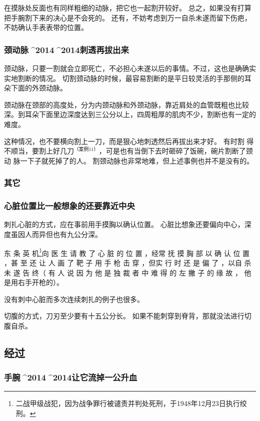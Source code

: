 \documentclass[UTF8]{ctexart}
\begin{document}
在摸脉处反面也有同样粗细的动脉，把它也一起割开较好。
总之，如果没有打算把手腕割下来的决心是不会死的。 
还有，不妨考虑到万一自杀未遂而留下伤疤，不妨确认手表表带的位置。

\subsubsection{颈动脉^^^^2014^^^^2014刺透再拔出来}

颈动脉，只要一割就会立即死亡，不必担心未遂以后的事情。不过，这也是确确实实地割断的情况。
切割颈动脉的时候，最容易割断的是平日较灵活的手那侧的耳朵下面的外颈动脉。

颈动脉在颈部的高度处，分为内颈动脉和外颈动脉，靠近肩处的血管既粗也比较深。到耳朵下面里边深度达到三公分以上，四周粗厚的肌肉不少，割断也有一定的难度。

这种情况，也不要横向割上一刀，而是狠心地刺透然后再拔出来才好。
有时割 得不顺当，要割上好几刀$^{（案例11）}$，可是也有当倒下去时砸碎了饭碗，碗片割断了颈动 脉一下子就死掉了的人。
割颈动脉也非常地难，但上述事例也并不是没有的。

\subsubsection{其它}

\subsubsection*{心脏位置比一般想象的还要靠近中央}

刺扎心脏的方式，应在事前用手摸胸以确认位置。
心脏比想象还要偏向中心，深度虽因人而异但也有九公分深。

东 条 英 机\footnote{二战甲级战犯，因为战争罪行被谴责并判处死刑，于1948年12月23日执行绞刑。}向 医 生 请 教 了 心 脏 的 位 置 ，经常 抚 摸 胸 部 以 确 认 位 置 ，甚 至 还 让 人 画 了 靶 子 用 手 枪 击 穿 ，但实 行 时 还 是 偏 了 ，以自 杀 未 遂 告 终（ 有 人 说 因 为 他 是 独 裁 者 中 难 得 的 左 撇 子 的 缘 故 ， 他是用右手开枪的）。

没有刺中心脏而多次连续刺扎的例子也很多。

切腹的方式，刀刃至少要有十五公分长。
如果不能刺穿到脊背，那就没法进行切腹自杀。

\subsection{经过}

\subsubsection{手腕^^^^2014^^^^2014让它流掉一公升血}
\end{document}
